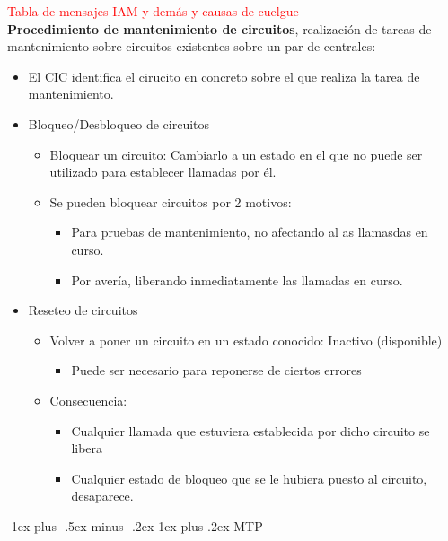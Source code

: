 \documentclass[10pt,portrait, twocolumn]{article}
\makeatletter
\renewcommand{\subsubsection}{\@startsection{subsubsection}{3}{0mm}%
                                {-1ex plus -.5ex minus -.2ex}%
                                {1ex plus .2ex}%
                                {\normalfont\small\bfseries}}
\makeatother
\begin{document}
\textcolor{red}{Tabla de mensajes IAM y demás y causas de cuelgue}\\

\textbf{Procedimiento de mantenimiento de circuitos}, realización de tareas de mantenimiento sobre circuitos existentes sobre un par de centrales:
	\begin{itemize}
	\item El CIC identifica el cirucito en concreto sobre el que realiza la tarea de mantenimiento.
	\end{itemize}
	
\begin{itemize}
\item Bloqueo/Desbloqueo de circuitos
	\begin{itemize}
	\item Bloquear un circuito: Cambiarlo a un estado en el que no puede ser utilizado para establecer llamadas por él.
	\item Se pueden bloquear circuitos por 2 motivos:
		\begin{itemize}
		\item Para pruebas de mantenimiento, no afectando al as llamasdas en curso.
		\item Por avería, liberando inmediatamente las llamadas en curso.
		\end{itemize}
	\end{itemize}
\item Reseteo de circuitos
	\begin{itemize}
	\item Volver a poner un circuito en un estado conocido: Inactivo (disponible)
		\begin{itemize}
		\item Puede ser necesario para reponerse de ciertos errores
		\end{itemize}
	\item Consecuencia:
		\begin{itemize}
		\item Cualquier llamada que estuviera establecida por dicho circuito se libera
		\item Cualquier estado de bloqueo que se le hubiera puesto al circuito, desaparece.
		\end{itemize}
	\end{itemize}
\end{itemize}

\subsubsection{MTP}
\end{document}
